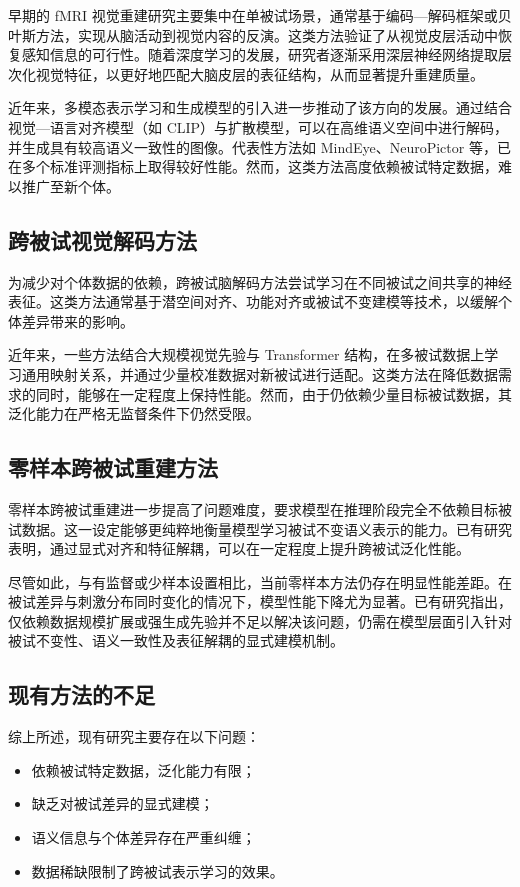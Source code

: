 早期的 fMRI 视觉重建研究主要集中在单被试场景，通常基于编码—解码框架或贝叶斯方法，实现从脑活动到视觉内容的反演。这类方法验证了从视觉皮层活动中恢复感知信息的可行性。随着深度学习的发展，研究者逐渐采用深层神经网络提取层次化视觉特征，以更好地匹配大脑皮层的表征结构，从而显著提升重建质量。

近年来，多模态表示学习和生成模型的引入进一步推动了该方向的发展。通过结合视觉—语言对齐模型（如 CLIP）与扩散模型，可以在高维语义空间中进行解码，并生成具有较高语义一致性的图像。代表性方法如 MindEye、NeuroPictor 等，已在多个标准评测指标上取得较好性能。然而，这类方法高度依赖被试特定数据，难以推广至新个体。

\subsection{跨被试视觉解码方法}

为减少对个体数据的依赖，跨被试脑解码方法尝试学习在不同被试之间共享的神经表征。这类方法通常基于潜空间对齐、功能对齐或被试不变建模等技术，以缓解个体差异带来的影响。

近年来，一些方法结合大规模视觉先验与 Transformer 结构，在多被试数据上学习通用映射关系，并通过少量校准数据对新被试进行适配。这类方法在降低数据需求的同时，能够在一定程度上保持性能。然而，由于仍依赖少量目标被试数据，其泛化能力在严格无监督条件下仍然受限。

\subsection{零样本跨被试重建方法}

零样本跨被试重建进一步提高了问题难度，要求模型在推理阶段完全不依赖目标被试数据。这一设定能够更纯粹地衡量模型学习被试不变语义表示的能力。已有研究表明，通过显式对齐和特征解耦，可以在一定程度上提升跨被试泛化性能。

尽管如此，与有监督或少样本设置相比，当前零样本方法仍存在明显性能差距。在被试差异与刺激分布同时变化的情况下，模型性能下降尤为显著。已有研究指出，仅依赖数据规模扩展或强生成先验并不足以解决该问题，仍需在模型层面引入针对被试不变性、语义一致性及表征解耦的显式建模机制。

\subsection{现有方法的不足}

综上所述，现有研究主要存在以下问题：

\begin{itemize}
  \item 依赖被试特定数据，泛化能力有限；
  \item 缺乏对被试差异的显式建模；
  \item 语义信息与个体差异存在严重纠缠；
  \item 数据稀缺限制了跨被试表示学习的效果。
\end{itemize}

